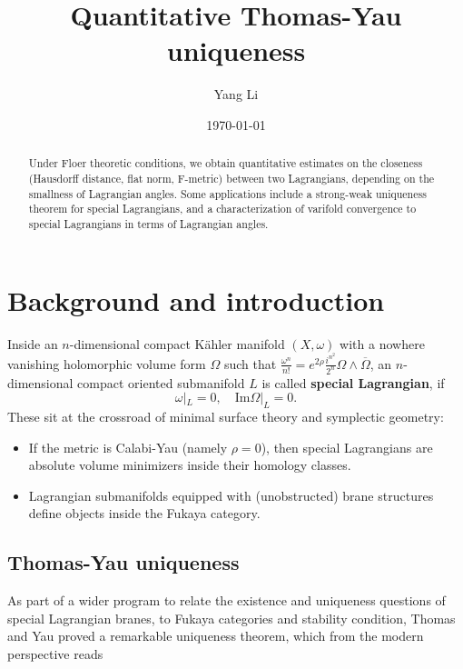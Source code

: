 \documentclass[a4paper]{article}
\title{Quantitative Thomas-Yau uniqueness}
\author{Yang Li}
\date{\today}
\theoremstyle{definition}
\begin{document}
	\maketitle
	
	
	
\begin{abstract}
	Under Floer theoretic conditions, 
we obtain quantitative estimates on the closeness (Hausdorff distance, flat norm, F-metric) between two Lagrangians, depending on the smallness of Lagrangian angles. Some applications include a strong-weak uniqueness theorem for special Lagrangians, and a characterization of varifold convergence to special Lagrangians in terms of Lagrangian angles.
\end{abstract}



\section{Background and introduction}



Inside an $n$-dimensional compact K\"ahler manifold $(X, \omega)$ with a nowhere vanishing holomorphic volume form $\Omega$ such that $\frac{\omega^n}{n!}=e^{2\rho}\frac{i^{n^2}}{2^n}\Omega\wedge \overline{\Omega}$, an $n$-dimensional compact oriented submanifold $L$ is called \textbf{special Lagrangian}, if 
\begin{equation}
\omega|_L=0, \quad \text{Im} \Omega|_L=0.
\end{equation}
These sit at the crossroad of minimal surface theory and symplectic geometry:
\begin{itemize}
\item If the metric is Calabi-Yau (namely $\rho=0$), then special Lagrangians are absolute volume minimizers inside their homology classes.

\item Lagrangian submanifolds equipped with (unobstructed) brane structures define objects inside the Fukaya category. 
\end{itemize}




\subsection{Thomas-Yau uniqueness}


As part of a wider program to relate the existence and uniqueness questions of special Lagrangian branes, to Fukaya categories and stability condition, Thomas and Yau \cite{ThomasYau} proved a remarkable uniqueness theorem, which from the modern perspective reads
\end{document}
